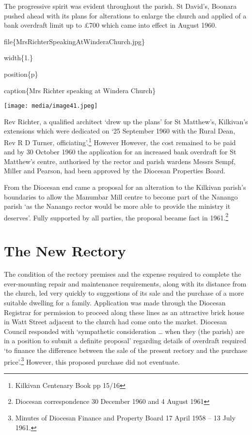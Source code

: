 The progressive spirit was evident throughout the parish. St David's, Boonara pushed ahead with its plans for alterations to enlarge the church and applied of a bank overdraft limit up to £700 which came into effect in August 1960.

file\{MrsRichterSpeakingAtWinderaChurch.jpg\}

width\{1.\}

position\{p\}

caption\{Mrs Richter speaking at Windera Church\}

\texttt{[image: media/image41.jpeg]}

Rev Richter, a qualified architect `drew up the plans' for St Matthew's, Kilkivan's extensions which were dedicated on `25 September 1960 with the Rural Dean, Rev R D Turner, officiating'.\footnote{Kilkivan Centenary Book pp 15/16} However However, the cost remained to be paid and by 30 October 1960 the application for an increased bank overdraft for St Matthew's centre, authorised by the rector and parish wardens Messrs Sempf, Miller and Pearson, had been approved by the Diocesan Properties Board.

From the Diocesan end came a proposal for an alteration to the Kilkivan parish's boundaries to allow the Manumbar Mill centre to become part of the Nanango parish `as the Nanango rector would be more able to provide the ministry it deserves'. Fully supported by all parties, the proposal became fact in 1961.\footnote{Diocesan correspondence 30 December 1960 and 4 August 1961}

\hypertarget{the-new-rectory}{%
\section{The New Rectory}\label{the-new-rectory}}

The condition of the rectory premises and the expense required to complete the ever-mounting repair and maintenance requirements, along with its distance from the church, led very quickly to suggestions of its sale and the purchase of a more suitable dwelling for a family. Application was made through the Diocesan Registrar for permission to proceed along these lines as an attractive brick house in Watt Street adjacent to the church had come onto the market. Diocesan Council responded with `sympathetic consideration \ldots{} when they (the parish) are in a position to submit a definite proposal' regarding details of overdraft required `to finance the difference between the sale of the present rectory and the purchase price'.\footnote{Minutes of Diocesan Finance and Property Board 17 April 1958 -- 13 July 1961.} However, this proposed purchase did not eventuate.

